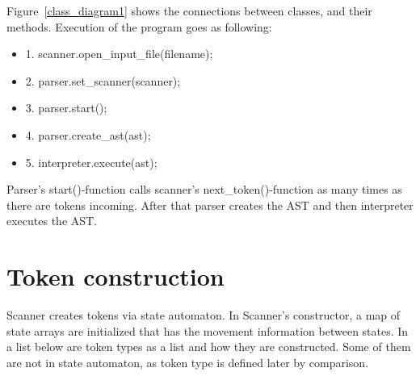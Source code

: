 \documentclass[english,11pt,twoside,a4paper]{article}
\begin{document}
Figure~\ref{class_diagram1} shows the connections between classes, and their methods. Execution of the program goes as following:

\begin{itemize}
	\item 1. scanner.open\_input\_file(filename);
	\item 2. parser.set\_scanner(scanner);
	\item 3. parser.start();
	\item 4. parser.create\_ast(ast);
	\item 5. interpreter.execute(ast);
\end{itemize}

Parser's start()-function calls scanner's next\_token()-function as many times as there are tokens incoming. After that parser creates the AST and then interpreter executes the AST.

\section{Token construction}

Scanner creates tokens via state automaton. In Scanner's constructor, a map of state arrays are initialized that has the movement information between states. In a list below are token types as a list and how they are constructed. Some of them are not in state automaton, as token type is defined later by comparison.
\end{document}
